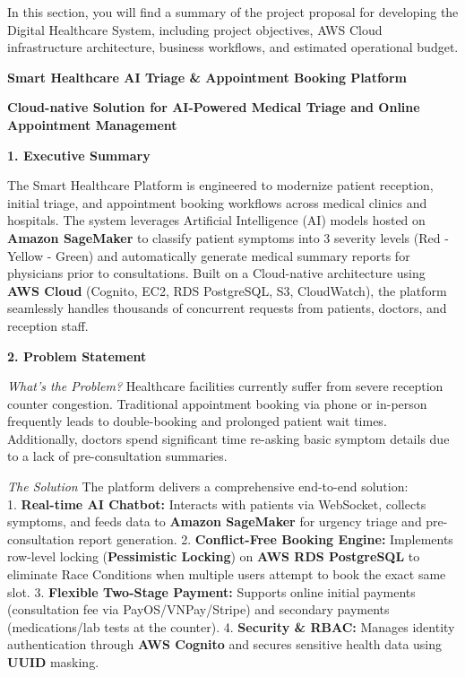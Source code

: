 In this section, you will find a summary of the project proposal for
developing the Digital Healthcare System, including project objectives,
AWS Cloud infrastructure architecture, business workflows, and estimated
operational budget.

\vspace{0.5em}\noindent\textbf{Smart Healthcare AI Triage \& Appointment Booking Platform}

\vspace{0.5em}\noindent\textbf{Cloud-native Solution for AI-Powered Medical Triage and
Online Appointment Management}

\vspace{0.5em}\noindent\textbf{1. Executive Summary}

The Smart Healthcare Platform is engineered to modernize patient
reception, initial triage, and appointment booking workflows across
medical clinics and hospitals. The system leverages Artificial
Intelligence (AI) models hosted on \textbf{Amazon SageMaker} to classify
patient symptoms into 3 severity levels (Red - Yellow - Green) and
automatically generate medical summary reports for physicians prior to
consultations. Built on a Cloud-native architecture using \textbf{AWS
Cloud} (Cognito, EC2, RDS PostgreSQL, S3, CloudWatch), the platform
seamlessly handles thousands of concurrent requests from patients,
doctors, and reception staff.

\vspace{0.5em}\noindent\textbf{2. Problem Statement}

\emph{What's the Problem?} Healthcare facilities currently suffer from
severe reception counter congestion. Traditional appointment booking via
phone or in-person frequently leads to double-booking and prolonged
patient wait times. Additionally, doctors spend significant time
re-asking basic symptom details due to a lack of pre-consultation
summaries.

\emph{The Solution} The platform delivers a comprehensive end-to-end
solution:\\
1. \textbf{Real-time AI Chatbot:} Interacts with patients via WebSocket,
collects symptoms, and feeds data to \textbf{Amazon SageMaker} for
urgency triage and pre-consultation report generation. 2.
\textbf{Conflict-Free Booking Engine:} Implements row-level locking
(\textbf{Pessimistic Locking}) on \textbf{AWS RDS PostgreSQL} to
eliminate Race Conditions when multiple users attempt to book the exact
same slot. 3. \textbf{Flexible Two-Stage Payment:} Supports online
initial payments (consultation fee via PayOS/VNPay/Stripe) and secondary
payments (medications/lab tests at the counter). 4. \textbf{Security \&
RBAC:} Manages identity authentication through \textbf{AWS Cognito} and
secures sensitive health data using \textbf{UUID} masking.

